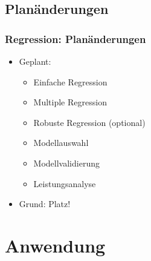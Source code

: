 \documentclass{beamer}
\begin{document}
\subsection{Planänderungen}
\begin{frame}
  \frametitle{Regression: Planänderungen}

  \begin{itemize}
  \item Geplant:
    \begin{itemize}
    \item Einfache Regression
    \item Multiple Regression
    \item {Robuste Regression (optional)}
    \item Modellauswahl
    \item {Modellvalidierung}
    \item Leistungsanalyse
    \end{itemize}
    
    \pause\pause
  
  \item Grund: Platz!
  \end{itemize}

\end{frame}

\section{Anwendung}
\end{document}
